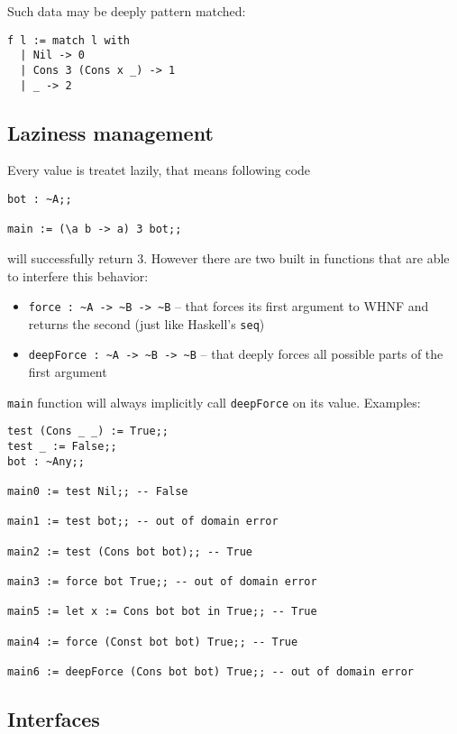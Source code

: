 \documentclass[11pt]{article}
\begin{document}
Such data may be deeply pattern matched:

\begin{verbatim}
f l := match l with
  | Nil -> 0
  | Cons 3 (Cons x _) -> 1
  | _ -> 2
\end{verbatim}

\subsection{Laziness management}
\label{sec:orgeaf1cef}

Every value is treatet lazily, that means following code

\begin{verbatim}
bot : ~A;;

main := (\a b -> a) 3 bot;;
\end{verbatim}

will successfully return 3. However there are two built in functions that are able to interfere this behavior:

\begin{itemize}
\item \texttt{force : \textasciitilde{}A -> \textasciitilde{}B -> \textasciitilde{}B} – that forces its first argument to WHNF and returns the second (just like Haskell's \texttt{seq})
\item \texttt{deepForce : \textasciitilde{}A -> \textasciitilde{}B -> \textasciitilde{}B} – that deeply forces all possible parts of the first argument
\end{itemize}

\texttt{main} function will always implicitly call \texttt{deepForce} on its value. Examples:

\begin{verbatim}
test (Cons _ _) := True;;
test _ := False;;
bot : ~Any;;

main0 := test Nil;; -- False

main1 := test bot;; -- out of domain error

main2 := test (Cons bot bot);; -- True

main3 := force bot True;; -- out of domain error

main5 := let x := Cons bot bot in True;; -- True

main4 := force (Const bot bot) True;; -- True

main6 := deepForce (Cons bot bot) True;; -- out of domain error
\end{verbatim}

\subsection{Interfaces}
\label{sec:org0bfe5c8}
\end{document}
